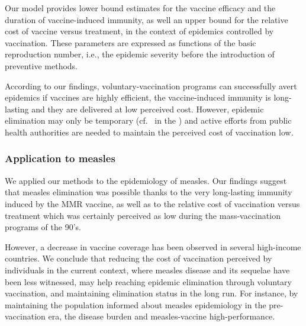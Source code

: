 Our model provides lower bound estimates for the vaccine efficacy and the duration of vaccine-induced immunity, as well an upper bound for the relative cost of vaccine versus treatment, in the context of epidemics controlled by vaccination. These parameters are expressed as functions of the basic reproduction number, i.e., the epidemic severity before the introduction of preventive methods. 

According to our findings, voluntary-vaccination programs can successfully avert epidemics if vaccines are highly efficient, the vaccine-induced immunity is long-lasting and they are delivered at low perceived cost. However, epidemic elimination may only be temporary (cf.~ in the ) and active efforts from public health authorities are needed to maintain the perceived cost of vaccination low. 



\subsubsection*{Application to measles}
We applied our methods to the epidemiology of measles. Our findings suggest that measles elimination was possible thanks to the very long-lasting immunity induced by the MMR vaccine, as well as to the relative cost of vaccination versus treatment which was certainly perceived as low during the mass-vaccination programs of the 90's. 

However, a decrease in vaccine coverage has been observed in several high-income countries. We conclude that reducing the cost of vaccination perceived by individuals in the current context, where measles disease and its sequelae have been less witnessed, may help reaching epidemic elimination through voluntary vaccination, and maintaining elimination status in the long run. For instance, by maintaining the population informed about measles epidemiology in the pre-vaccination era, the disease burden and measles-vaccine high-performance.


%


